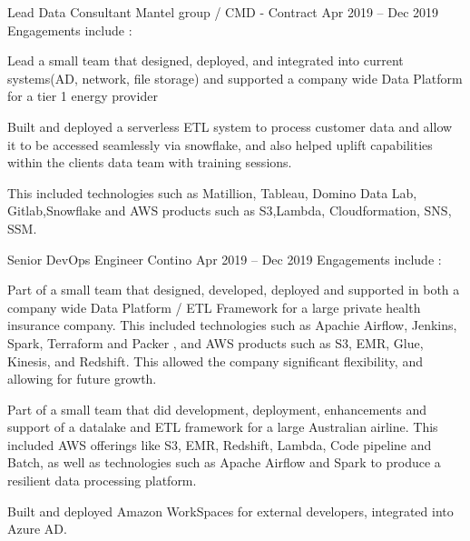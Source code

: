 \begin{cventries}
  \cventryextended
  {Lead Data Consultant} %
  {Mantel group / CMD - Contract} %
  {} %
  {Apr 2019 – Dec 2019} %
  {Engagements include :} %
  {
    \begin{cvitems} %
      \item{Lead a small team that designed, deployed, and integrated into
                  current
                  systems(AD, network, file storage) and supported a company
                  wide Data
                  Platform for a tier 1
                  energy provider}
      \item {Built and deployed a serverless ETL system to process customer
                  data and allow it to be accessed seamlessly via snowflake,
                  and also
                  helped uplift capabilities within the clients data team with
                  training
                  sessions.}
      \item {This included technologies such as Matillion, Tableau, Domino Data
                  Lab,
                  Gitlab,Snowflake and AWS products such as S3,Lambda,
                  Cloudformation, SNS,
                  SSM.}
    \end{cvitems}
  }

  \cventryextended
  {Senior DevOps Engineer} %
  {Contino} %
  {} %
  {Apr 2019 – Dec 2019} %
  {Engagements include :} %
  {
    \begin{cvitems} %
      \item{Part of a small team that designed, developed, deployed and
                  supported in both a company wide Data Platform / ETL
                  Framework for a large
                  private health insurance company. This included technologies
                  such as Apachie
                  Airflow, Jenkins, Spark,  Terraform and Packer , and AWS
                  products such as S3,
                  EMR, Glue, Kinesis, and Redshift. This allowed the company
                  significant
                  flexibility, and allowing for future growth.}

      \item {Part of a small team that did development, deployment,
                  enhancements and support of a datalake and ETL framework for a large Australian
                  airline. This included AWS offerings like S3, EMR, Redshift, Lambda, Code
                  pipeline and Batch, as well as technologies such as Apache Airflow and Spark to
                  produce a resilient data processing platform. }
      \item {Built and deployed Amazon WorkSpaces for external developers, integrated into Azure AD.}
    \end{cvitems}
  }

\end{cventries}